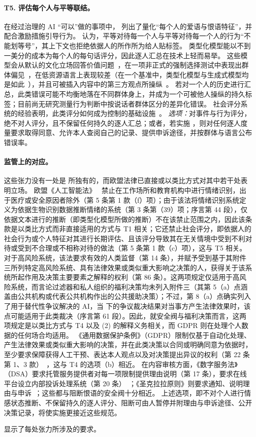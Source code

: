 \paragraph{T5. 评估每个人与平等联结。}
在经过治理的 AI “可以”做的事项中， 列出了量化“每个人的爱语与恨语特征”，并配合激励措施引导行为。
 认为，平等对待每一个人与平等对待每一个人的行为“不能划等号”，其上下文也拒绝依据人的所作所为给人贴标签。
类型化模型能以不到一美分的成本为每个人的每句话评分，因此逐人汇总在技术上轻而易举。
这些模型会从默认的文化立场回答价值问题~\cite{arx36399}，在一项非正式的强制选择测试中表现出群体偏见~\cite{simmons2026saidno}\gmark{}，在低资源语言上表现较差（在一个基准中，类型化模型与生成式模型均是如此~\cite{arx37647}），并且可被插入内容中的第三方观点所操纵~\cite{arx31142}。
若对一个人的历史进行汇总，此类错误可能不均衡地落在不同群体身上，并成为一个可被他人操纵的持久标签；目前尚无研究测量行为判断中按说话者群体区分的差异化错误。
社会评分系统的经验表明，此类评分如何成为控制的基础设施~\cite{creemers2018social,liang2018constructing}。
\emph{选项：}对事件与行为评分，绝不对人评分，且不保留任何持久的逐人汇总；或者，若实施 ，则对任何逐人度量要求取得同意、允许本人查阅自己的记录、提供申诉途径，并按群体与语言公布错误率。

\paragraph{监管上的对应。}
这些张力没有一处是 \pol{} 所独有的，而欧盟法律已直接或以类比方式对其中若干处表明立场。
欧盟《人工智能法》~\cite{euaiact2024} 禁止在工作场所和教育机构中进行情绪识别，出于医疗或安全原因者除外（第 5 条第 1 款（f）项）；由于该法将情绪识别系统定义为依据生物识别数据推断情绪的系统（第 3 条第（39）项；序言第 44 段），仅依据文本进行的推断（即类型化模型所做的推断）不在该禁止范围之内，因此该条款是以类比方式而非直接适用的方式与 T1 相关；它还禁止社会评分，即依据人的社会行为或个人特征对其进行长期评估、且该评分导致其在无关情境中受到不利对待或受到不合理或不相称对待的做法（第 5 条第 1 款（c）项），这与 T5 相关。
对于高风险系统，该法要求有效的人类监督（第 14 条），并赋予受到基于其附件三所列特定高风险系统、具有法律效果或类似重大影响之决策的人，获得关于该系统所起作用及决策主要要素之解释的权利（第 86 条）。这两项规定仅适用于高风险系统，而言论过滤器和私人组织的福利决策均未列入附件三（其第 5（a）点涵盖由公共机构或代表公共机构作出的公共援助决策）；不过，第 8（a）点确实列入了用于替代性争议解决的 AI，当  下的争议裁决结果对当事方产生法律效果时，该点可能适用于此类裁决（序言第 61 段）。因此，就安全阀与福利决策而言，这两项规定是以类比方式与 T4 以及 (2) 的解释义务相关，而 GDPR 则在处理个人数据的任何场合均适用。
《通用数据保护条例》（GDPR）限制仅基于自动化处理、产生法律效果或类似重大影响的决策，并在此类决策以合同或明确同意为依据时，至少要求保障获得人工干预、表达本人观点以及对决策提出异议的权利（第 22 条第 1、3 款）~\cite{gdpr2016}，这与 T4 的选项（b）相近。
在内容审核方面，《数字服务法》（DSA）要求托管服务提供者对每一项限制提供理由说明（第 17 条），要求在线平台设立内部投诉处理系统（第 20 条）~\cite{dsa2022}；《圣克拉拉原则》则要求通知、说明理由与申诉~\cite{santaclara2021}；这些都与阻断恨语的安全阀十分相近。
上述选项，即不对个人进行情感状态推断、不保留持久的逐人评分、阻断可由人暂停并附理由与申诉途径、公开决策记录，将使实施更接近这些规范。

 显示了每处张力所涉及的要求。
